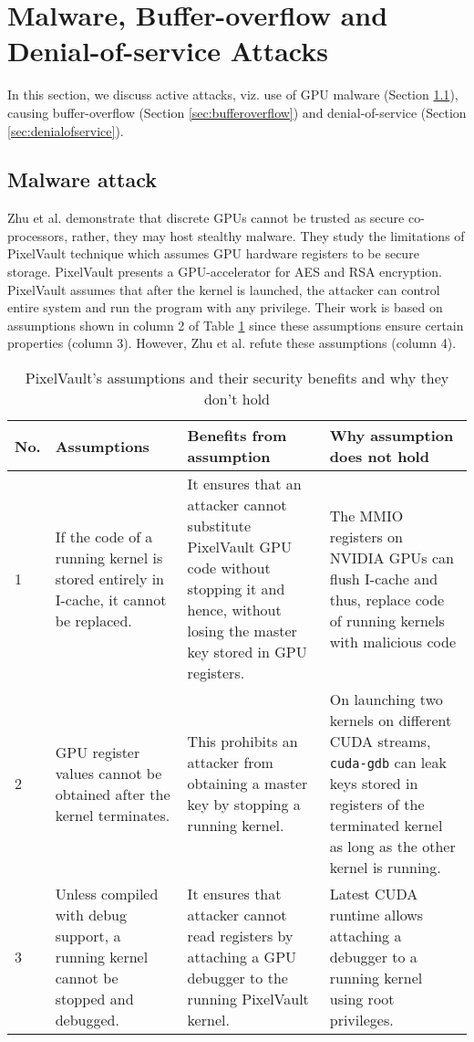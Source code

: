 \section{Malware, Buffer-overflow and Denial-of-service Attacks}\label{sec:malwareOverflowDoS}
In this section, we discuss active attacks, viz. use of GPU malware (Section \ref{sec:malware}),  causing buffer-overflow (Section \ref{sec:bufferoverflow}) and denial-of-service (Section \ref{sec:denialofservice}).  

\subsection{Malware attack}\label{sec:malware}


   
Zhu et al. \cite{zhu2017understanding} demonstrate that discrete GPUs cannot be trusted as secure co-processors, rather, they may host stealthy malware. They study the limitations of PixelVault \cite{vasiliadis2014pixelvault} technique   which assumes  GPU hardware registers to be secure storage. PixelVault presents a GPU-accelerator for AES and RSA encryption. PixelVault assumes that after the kernel is launched, the attacker can control entire system and run the program with any privilege. Their work is based on assumptions shown in column 2 of Table \ref{tab:pvassumptionrefute} since these assumptions ensure certain properties (column 3). However, Zhu et al. refute these assumptions (column 4). 
 
 
\begin{table}[htbp]
  \centering
  \caption{PixelVault's \cite{vasiliadis2014pixelvault} assumptions and their security benefits and why they don't hold \cite{zhu2017understanding}}
    \begin{tabular}{|l|p{4.5cm}|p{5.0cm}|p{5.5cm}|}
    \hline
    No. & Assumptions & Benefits from assumption & Why assumption does not hold \\
    \hline
    1 & If the code of a running kernel is stored entirely in I-cache, it cannot be replaced. & It ensures that an attacker cannot substitute PixelVault GPU code without stopping it and hence, without losing the master key stored in GPU registers.  & The MMIO registers on NVIDIA GPUs can flush I-cache and thus, replace code of running kernels with malicious code  \\
    \hline
    2 & GPU register values cannot be obtained after the kernel terminates.  & This prohibits an attacker from obtaining a master key by stopping a running kernel. &     On launching two kernels on different CUDA streams, {\tt cuda-gdb} can leak keys stored in registers of the terminated kernel as long as the other kernel is running.    
    \\
    \hline
    3 & Unless compiled with debug support, a running kernel cannot be stopped and debugged. & It ensures that attacker cannot read registers by attaching a GPU debugger to the running PixelVault kernel. & Latest CUDA runtime allows attaching a debugger to a running kernel using root privileges.  \\
    \hline
    \end{tabular}%
  \label{tab:pvassumptionrefute}%
\end{table}%
   
